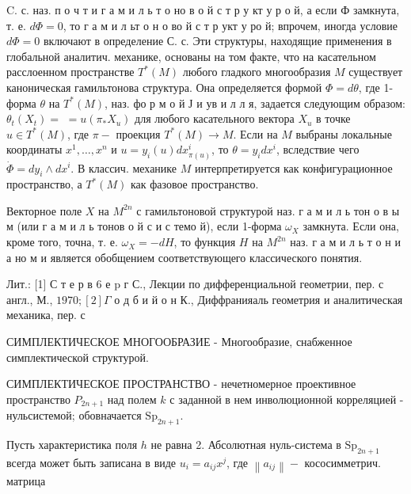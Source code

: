\documentclass[10pt]{article}
\begin{document}
C. с. наз. п о ч т и г а м и л ь т о но в о й с т р у кт у р о й, а если Ф замкнута, т. е. $d \Phi=0$, то г а м и л ьт о н о во й с т р укт у ро й; впрочем, иногда условие $d \Phi=0$ включают в определение С. с. Эти структуры, находящие применения в глобальной аналитич. механике, основаны на том факте, что на касательном расслоенном пространстве $T^{*}(M)$ любого гладкого многообразия $M$ существует каноническая гамильтонова структура. Она определяется формой $\Phi=d \theta$, где 1-форма $\theta$ на $T^{*}(M)$, наз. фо р м о й Ј и ув и л л я, задается следующим образом: $\theta_{t}\left(X_{t}\right)=$ $=u\left(\pi_{*} X_{u}\right)$ для любого касательного вектора $X_{u}$ в точке $u \in T^{*}(M)$, где $\pi-$ проекция $T^{*}(M) \rightarrow M$. Если на $M$ выбраны локальные координаты $x^{1}, \ldots, x^{n}$ и $u=y_{i}(u) d x_{\pi(u)}^{i}$, то $\theta=y_{i} d x^{i}$, вследствие чего $\dot{\Phi}=d y_{i} \wedge d x^{i}$. В классич. механике $M$ интерпретируется как конфигурационное пространство, а $T^{*}(M)$ как фазовое пространство.



Векторное поле $X$ на $M^{2 n}$ с гамильтоновой структурой наз. г а м и л ь тон о в ы м (или г а м и л ь тонов о й с и с темо й), если 1-форма $\omega_{X}$ замкнута. Если она, кроме того, точна, т. е. $\omega_{X}=-d H$, то функция $H$ на $M^{2 n}$ наз. г а м и л ь т о н и а но м и является обобщением соответствующего классического понятия.



Лит.: [1] С т е р в 6 е p г С., Лекции по дифференциальной геометрии, пер. с англ., М., $1970 ;[2] \Gamma$ о д б и й о н К., Диффранияаль геометрия и аналитическая механика, пер. с



СИМПЛЕКТИЧЕСКОЕ МНОГООБРАЗИЕ - Многообразие, снабженное симплектической структурой.



СИМПЛЕКТИЧЕСКОЕ ПРОСТРАНСТВО - нечетномерное проективное пространство $P_{2 n+1}$ над полем $k$ с заданной в нем инволюционной корреляцией - нульсистемой; обовначается $\mathrm{Sp}_{2 n+1}$.



Пусть характеристика поля $h$ не равна 2. Абсолютная нуль-система в $\mathrm{Sp}_{2 n+1}$ всегда может быть записана в виде $u_{i}=a_{i j} x^{j}$, где $\left\|a_{i j}\right\|-$ кососимметрич. матрица
\end{document}
